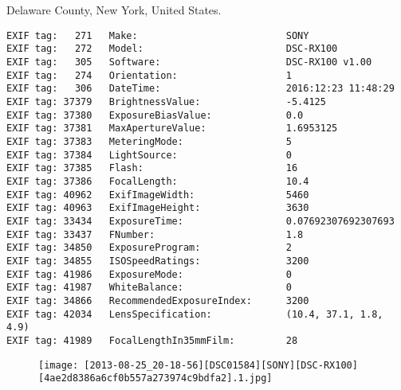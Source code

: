 \section{\protect{}}
\noindent Delaware County, New York, United States.
\noindent
\begin{lstlisting}
EXIF tag:   271   Make:                          SONY
EXIF tag:   272   Model:                         DSC-RX100
EXIF tag:   305   Software:                      DSC-RX100 v1.00
EXIF tag:   274   Orientation:                   1
EXIF tag:   306   DateTime:                      2016:12:23 11:48:29
EXIF tag: 37379   BrightnessValue:               -5.4125
EXIF tag: 37380   ExposureBiasValue:             0.0
EXIF tag: 37381   MaxApertureValue:              1.6953125
EXIF tag: 37383   MeteringMode:                  5
EXIF tag: 37384   LightSource:                   0
EXIF tag: 37385   Flash:                         16
EXIF tag: 37386   FocalLength:                   10.4
EXIF tag: 40962   ExifImageWidth:                5460
EXIF tag: 40963   ExifImageHeight:               3630
EXIF tag: 33434   ExposureTime:                  0.07692307692307693
EXIF tag: 33437   FNumber:                       1.8
EXIF tag: 34850   ExposureProgram:               2
EXIF tag: 34855   ISOSpeedRatings:               3200
EXIF tag: 41986   ExposureMode:                  0
EXIF tag: 41987   WhiteBalance:                  0
EXIF tag: 34866   RecommendedExposureIndex:      3200
EXIF tag: 42034   LensSpecification:             (10.4, 37.1, 1.8, 4.9)
EXIF tag: 41989   FocalLengthIn35mmFilm:         28

\end{lstlisting}
\clearpage
\begin{figure}
\raggedleft
\texttt{[image: [2013-08-25\_20-18-56][DSC01584][SONY][DSC-RX100][4ae2d8386a6cf0b557a273974c9bdfa2].1.jpg]}
\end{figure}


\clearpage
